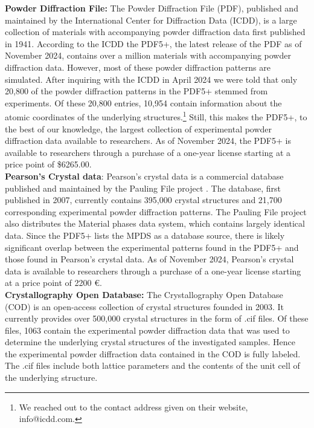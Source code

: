 \textbf{Powder Diffraction File:} \cite{PDFWeb} The Powder Diffraction File (PDF), published and maintained by the International Center for Diffraction Data (ICDD), is a large collection of materials with accompanying powder diffraction data first published in 1941\cite{GatesRector2019}. According to the ICDD the PDF5+, the latest release of the PDF as of November 2024, contains over a million materials with accompanying powder diffraction data. However, most of these powder diffraction patterns are simulated. After inquiring with the ICDD in April 2024 we were told that only 20,800 of the powder diffraction patterns in the PDF5+ stemmed from experiments. Of these 20,800 entries, 10,954 contain information about the atomic coordinates of the underlying structures.\footnote{We reached out to the contact address given on their website, info@icdd.com.} Still, this makes the PDF5+, to the best of our knowledge, the largest collection of experimental powder diffraction data available to researchers. As of November 2024, the PDF5+ is available to researchers through a purchase of a one-year license starting at a price point of \$6265.00.\\

\textbf{Pearson's Crystal data}:\cite{PearsonWeb} Pearson's crystal data is a commercial database published and maintained by the Pauling File project \cite{kaduk2007}. The database, first published in 2007, currently contains 395,000 crystal structures and 21,700 corresponding experimental powder diffraction patterns. The Pauling File project also distributes the Material phases data system, which contains largely identical data. Since the PDF5+ lists the MPDS as a database source, there is likely significant overlap between the experimental patterns found in the PDF5+ and those found in Pearson's crystal data. As of November 2024, Pearson's crystal data is available to researchers through a purchase of a one-year license starting at a price point of 2200 \euro.\\ 

\textbf{Crystallography Open Database:} \cite{CODWeb} The Crystallography Open Database (COD) is an open-access collection of crystal structures founded in 2003\cite{Graulis2009cod}. It currently provides over 500,000 crystal structures in the form of .cif files. Of these files, 1063 contain the experimental powder diffraction data that was used to determine the underlying crystal structures of the investigated samples. Hence the experimental powder diffraction data contained in the COD is fully labeled. The .cif files include both lattice parameters and the contents of the unit cell of the underlying structure. \\

